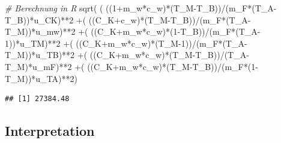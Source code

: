 \documentclass[class=article, crop=false]{standalone}
\newenvironment{Shaded}{\begin{snugshade}}{\end{snugshade}}
\newcommand{\CommentTok}[1]{\textcolor[rgb]{0.56,0.35,0.01}{\textit{#1}}}
\newcommand{\DecValTok}[1]{\textcolor[rgb]{0.00,0.00,0.81}{#1}}
\newcommand{\FunctionTok}[1]{\textcolor[rgb]{0.00,0.00,0.00}{#1}}
\newcommand{\NormalTok}[1]{#1}
\newcommand{\SpecialCharTok}[1]{\textcolor[rgb]{0.00,0.00,0.00}{#1}}
\begin{document}
\begin{Shaded}
\begin{Highlighting}[]
\CommentTok{\# Berechnung in R}
\FunctionTok{sqrt}\NormalTok{( ( ((}\DecValTok{1}\SpecialCharTok{+}\NormalTok{m\_w}\SpecialCharTok{*}\NormalTok{c\_w)}\SpecialCharTok{*}\NormalTok{(T\_M}\SpecialCharTok{{-}}\NormalTok{T\_B))}\SpecialCharTok{/}\NormalTok{(m\_F}\SpecialCharTok{*}\NormalTok{(T\_A}\SpecialCharTok{{-}}\NormalTok{T\_B))}\SpecialCharTok{*}\NormalTok{u\_CK)}\SpecialCharTok{**}\DecValTok{2}
     \SpecialCharTok{+}\NormalTok{( ((C\_K}\SpecialCharTok{+}\NormalTok{c\_w)}\SpecialCharTok{*}\NormalTok{(T\_M}\SpecialCharTok{{-}}\NormalTok{T\_B))}\SpecialCharTok{/}\NormalTok{(m\_F}\SpecialCharTok{*}\NormalTok{(T\_A}\SpecialCharTok{{-}}\NormalTok{T\_M))}\SpecialCharTok{*}\NormalTok{u\_mw)}\SpecialCharTok{**}\DecValTok{2}
     \SpecialCharTok{+}\NormalTok{( ((C\_K}\SpecialCharTok{+}\NormalTok{m\_w}\SpecialCharTok{*}\NormalTok{c\_w)}\SpecialCharTok{*}\NormalTok{(}\DecValTok{1}\SpecialCharTok{{-}}\NormalTok{T\_B))}\SpecialCharTok{/}\NormalTok{(m\_F}\SpecialCharTok{*}\NormalTok{(T\_A}\DecValTok{{-}1}\NormalTok{))}\SpecialCharTok{*}\NormalTok{u\_TM)}\SpecialCharTok{**}\DecValTok{2}
     \SpecialCharTok{+}\NormalTok{( ((C\_K}\SpecialCharTok{+}\NormalTok{m\_w}\SpecialCharTok{*}\NormalTok{c\_w)}\SpecialCharTok{*}\NormalTok{(T\_M}\DecValTok{{-}1}\NormalTok{))}\SpecialCharTok{/}\NormalTok{(m\_F}\SpecialCharTok{*}\NormalTok{(T\_A}\SpecialCharTok{{-}}\NormalTok{T\_M))}\SpecialCharTok{*}\NormalTok{u\_TB)}\SpecialCharTok{**}\DecValTok{2}
     \SpecialCharTok{+}\NormalTok{( ((C\_K}\SpecialCharTok{+}\NormalTok{m\_w}\SpecialCharTok{*}\NormalTok{c\_w)}\SpecialCharTok{*}\NormalTok{(T\_M}\SpecialCharTok{{-}}\NormalTok{T\_B))}\SpecialCharTok{/}\NormalTok{(T\_A}\SpecialCharTok{{-}}\NormalTok{T\_M)}\SpecialCharTok{*}\NormalTok{u\_mF)}\SpecialCharTok{**}\DecValTok{2}
     \SpecialCharTok{+}\NormalTok{( ((C\_K}\SpecialCharTok{+}\NormalTok{m\_w}\SpecialCharTok{*}\NormalTok{c\_w)}\SpecialCharTok{*}\NormalTok{(T\_M}\SpecialCharTok{{-}}\NormalTok{T\_B))}\SpecialCharTok{/}\NormalTok{(m\_F}\SpecialCharTok{*}\NormalTok{(}\DecValTok{1}\SpecialCharTok{{-}}\NormalTok{T\_M))}\SpecialCharTok{*}\NormalTok{u\_TA)}\SpecialCharTok{**}\DecValTok{2}\NormalTok{)}
\end{Highlighting}
\end{Shaded}

\begin{verbatim}
## [1] 27384.48
\end{verbatim}

\hypertarget{interpretation}{%
\subsection*{Interpretation}\label{interpretation}}
\end{document}
